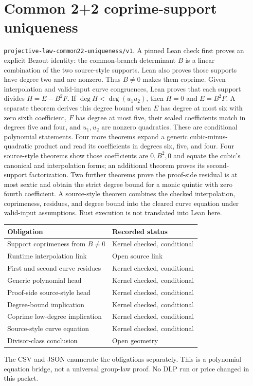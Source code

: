 \documentclass[11pt]{article}
\begin{document}
\section*{Common 2+2 coprime-support uniqueness}
\texttt{projective-law-common22-uniqueness/v1}. A pinned Lean check first proves
an explicit Bezout identity: the common-branch determinant $B$ is a linear
combination of the two source-style supports. Lean also proves those supports
have degree two and are nonzero. Thus $B\ne0$ makes them coprime.
Given interpolation and valid-input curve congruences, Lean proves that each
support divides $H=E-B^2F$. If $\deg H<\deg(u_1u_2)$, then $H=0$ and
$E=B^2F$. A separate theorem derives this degree bound when $E$ has degree
at most six with zero sixth coefficient, $F$ has degree at most five, their
scaled coefficients match in degrees five and four, and $u_1,u_2$ are nonzero
quadratics. These are conditional polynomial statements.
Four more theorems expand a generic cubic-minus-quadratic product and read its
coefficients in degrees six, five, and four. Four source-style theorems show
those coefficients are $0,B^2,0$ and equate the cubic's canonical and
interpolation forms; an additional theorem proves its second-support
factorization. Two further theorems prove the proof-side residual is
at most sextic and obtain the strict degree bound for a monic quintic with
zero fourth coefficient. A source-style theorem combines the checked
interpolation, coprimeness, residues, and degree bound into the cleared
curve equation under valid-input assumptions. Rust execution is not
translated into Lean here.

\begin{center}
\begin{tabular}{ll}
\toprule
Obligation & Recorded status\\
\midrule
Support coprimeness from $B\ne0$ & Kernel checked, conditional\\
Runtime interpolation link & Open source link\\
First and second curve residues & Kernel checked, conditional\\
Generic polynomial head & Kernel checked, conditional\\
Proof-side source-style head & Kernel checked, conditional\\
Degree-bound implication & Kernel checked, conditional\\
Coprime low-degree implication & Kernel checked, conditional\\
Source-style curve equation & Kernel checked, conditional\\
Divisor-class conclusion & Open geometry\\
\bottomrule
\end{tabular}
\end{center}

\noindent The CSV and JSON enumerate the obligations separately. This is a
polynomial equation bridge, not a universal group-law proof. No DLP run or
price changed in this packet.
\end{document}
